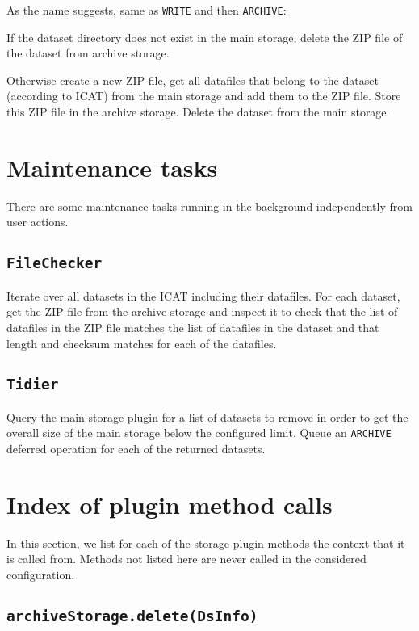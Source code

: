 \documentclass[paper=a4]{scrartcl}
\begin{document}
As the name suggests, same as \texttt{WRITE} and then
\texttt{ARCHIVE}:

If the dataset directory does not exist in the main storage, delete
the ZIP file of the dataset from archive storage.

Otherwise create a new ZIP file, get all datafiles that belong to the
dataset (according to ICAT) from the main storage and add them to the
ZIP file.  Store this ZIP file in the archive storage.  Delete the
dataset from the main storage.


\section{Maintenance tasks}
\label{sec:maintenance}

There are some maintenance tasks running in the background
independently from user actions.

\subsection{\texttt{FileChecker}}
\label{sec:maintenance:filechecker}

Iterate over all datasets in the ICAT including their datafiles.  For
each dataset, get the ZIP file from the archive storage and inspect it
to check that the list of datafiles in the ZIP file matches the list
of datafiles in the dataset and that length and checksum matches for
each of the datafiles.

\subsection{\texttt{Tidier}}
\label{sec:maintenance:tidier}

Query the main storage plugin for a list of datasets to remove in
order to get the overall size of the main storage below the configured
limit.  Queue an \texttt{ARCHIVE} deferred operation for each of the
returned datasets.


\section{Index of plugin method calls}
\label{sec:plugincalls}

In this section, we list for each of the storage plugin methods the
context that it is called from.  Methods not listed here are never
called in the considered configuration.

\subsection{\texttt{archiveStorage.delete(DsInfo)}}
\end{document}
